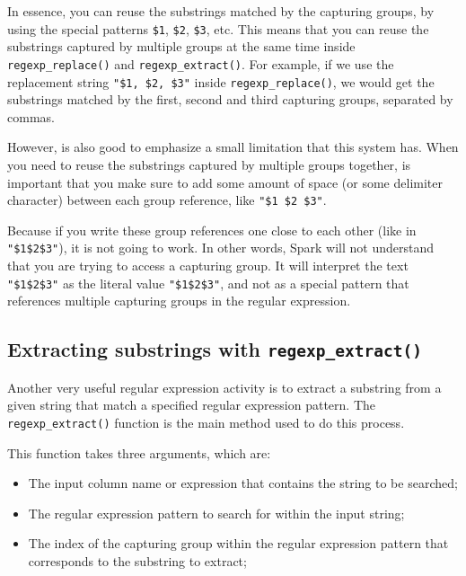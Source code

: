 \documentclass[
  11pt,
  letterpaper,
  DIV=11,
  numbers=noendperiod]{scrreprt}
\providecommand{\tightlist}{%
  \setlength{\itemsep}{0pt}\setlength{\parskip}{0pt}}\usepackage{longtable,booktabs,array}
\begin{document}
In essence, you can reuse the substrings matched by the capturing
groups, by using the special patterns \texttt{\$1}, \texttt{\$2},
\texttt{\$3}, etc. This means that you can reuse the substrings captured
by multiple groups at the same time inside \texttt{regexp\_replace()}
and \texttt{regexp\_extract()}. For example, if we use the replacement
string \texttt{"\$1,\ \$2,\ \$3"} inside \texttt{regexp\_replace()}, we
would get the substrings matched by the first, second and third
capturing groups, separated by commas.

However, is also good to emphasize a small limitation that this system
has. When you need to reuse the substrings captured by multiple groups
together, is important that you make sure to add some amount of space
(or some delimiter character) between each group reference, like
\texttt{"\$1\ \$2\ \$3"}.

Because if you write these group references one close to each other
(like in \texttt{"\$1\$2\$3"}), it is not going to work. In other words,
Spark will not understand that you are trying to access a capturing
group. It will interpret the text \texttt{"\$1\$2\$3"} as the literal
value \texttt{"\$1\$2\$3"}, and not as a special pattern that references
multiple capturing groups in the regular expression.

\subsection{\texorpdfstring{Extracting substrings with
\texttt{regexp\_extract()}}{Extracting substrings with regexp\_extract()}}\label{sec-regexp-extract}

Another very useful regular expression activity is to extract a
substring from a given string that match a specified regular expression
pattern. The \texttt{regexp\_extract()} function is the main method used
to do this process.

This function takes three arguments, which are:

\begin{itemize}
\tightlist
\item
  The input column name or expression that contains the string to be
  searched;
\item
  The regular expression pattern to search for within the input string;
\item
  The index of the capturing group within the regular expression pattern
  that corresponds to the substring to extract;
\end{itemize}
\end{document}
